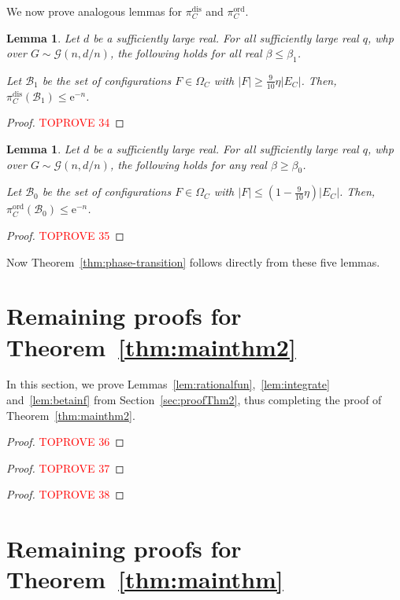 \documentclass[11pt]{article}
\theoremstyle{plain}
\newtheorem{lemma}[theorem]{Lemma}
\newcommand{\G}{\mathcal{G}}
\newcommand{\emm}{\mathrm{e}}
\newcommand{\1}{\mathbb{1}}
\newcommand{\ord}{\mathrm{ord}}
\newcommand{\dis}{\mathrm{dis}}
\begin{document}
We now prove analogous lemmas for \(\pi^\dis_C\) and \(\pi^\ord_C\). 

\begin{lemma}\label{lem:error-vanishes-under-disorder}
    Let $d$ be a sufficiently large real. For all sufficiently large real $q$, whp over \(G\sim\G(n,d/n)\), the following holds for all real \(\beta\leq\beta_1\).

    Let $\mathcal{B}_1$ be the set of configurations $F\in \Omega_C$ with $ |F|\geq \tfrac{9}{10}\eta |E_C|$.  Then, $\pi^{\dis}_C(\mathcal{B}_1)\leq \emm^{-n}$.
\end{lemma}
\begin{proof}\textcolor{red}{TOPROVE 34}\end{proof}

\begin{lemma}
    Let $d$ be a sufficiently large real. For all sufficiently large real $q$, whp over \(G\sim\G(n,d/n)\), the following holds for any real \(\beta\geq\beta_0\).

    Let $\mathcal{B}_0$ be the set of configurations $F\in \Omega_C$ with $|F|\leq (1-\tfrac{9}{10}\eta)|E_C|$.  Then, $\pi^{\ord}_C(\mathcal{B}_0)\leq \emm^{-n}$.
\end{lemma}
\begin{proof}\textcolor{red}{TOPROVE 35}\end{proof}

Now Theorem~\ref{thm:phase-transition} follows directly from these five lemmas. 

\section{Remaining proofs for Theorem~\ref{thm:mainthm2}} \label{sec:remproof2}
In this section, we prove Lemmas~\ref{lem:rationalfun},~\ref{lem:integrate} and~\ref{lem:betainf} from Section~\ref{sec:proofThm2}, thus completing the proof of Theorem~\ref{thm:mainthm2}.
\rationalfun*
\begin{proof}\textcolor{red}{TOPROVE 36}\end{proof}
\integrate*
\begin{proof}\textcolor{red}{TOPROVE 37}\end{proof}
\betainf*
\begin{proof}\textcolor{red}{TOPROVE 38}\end{proof}
\section{Remaining proofs for Theorem~\ref{thm:mainthm}} \label{sec:putting-ingredients-together}
\end{document}
